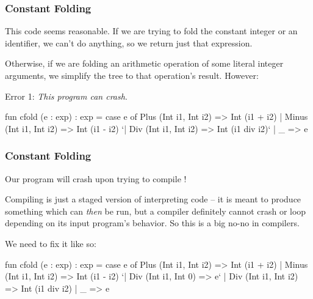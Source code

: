 \documentclass[aspectratio=169]{beamer}
\begin{document}
\begin{frame}[fragile]
  \frametitle{Constant Folding}

  This code seems reasonable. If we are trying to fold the constant integer
  or an identifier, we can't do anything, so we return just that expression.

  \vspace{\fill}

  Otherwise, if we are folding an arithmetic operation of some literal integer
  arguments, we simplify the tree to that operation's result. However:

  \vspace{\fill}

  Error 1: \textit{This program can crash}.

  \vspace{\fill}

  {\small
  \begin{codeblock}
    fun cfold (e : exp) : exp =
      case e of
        Plus  (Int i1, Int i2) => Int (i1 + i2)
      | Minus (Int i1, Int i2) => Int (i1 - i2)
      `| Div   (Int i1, Int i2) => Int (i1 div i2)`
      | _ => e
  \end{codeblock}
  }
\end{frame}

\begin{frame}[fragile]
  \frametitle{Constant Folding}

  Our program will crash upon trying to compile !

  \vspace{\fill}

  Compiling is just a staged version of interpreting code -- it is meant to
  produce something which can \textit{then} be run, but a compiler definitely
  cannot crash or loop depending on its input program's behavior. So this is
  a big no-no in compilers.

  \vspace{\fill}

  We need to fix it like so:

  {\small
  \begin{codeblock}
    fun cfold (e : exp) : exp =
      case e of
        Plus  (Int i1, Int i2) => Int (i1 + i2)
      | Minus (Int i1, Int i2) => Int (i1 - i2)
      `| Div   (Int i1, Int 0) => e`
      | Div   (Int i1, Int i2) => Int (i1 div i2)
      | _ => e
  \end{codeblock}
  }
\end{frame}
\end{document}
